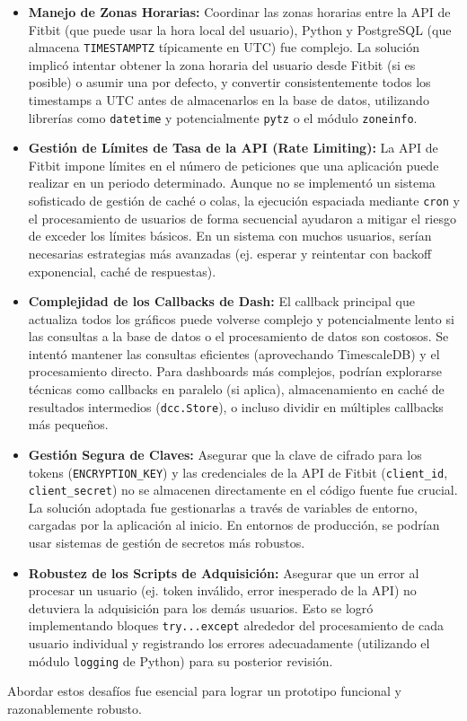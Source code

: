 \begin{itemize}
    \item \textbf{Manejo de Zonas Horarias:} Coordinar las zonas horarias entre la API de Fitbit (que puede usar la hora local del usuario), Python y PostgreSQL (que almacena \texttt{TIMESTAMPTZ} típicamente en UTC) fue complejo. La solución implicó intentar obtener la zona horaria del usuario desde Fitbit (si es posible) o asumir una por defecto, y convertir consistentemente todos los timestamps a UTC antes de almacenarlos en la base de datos, utilizando librerías como \texttt{datetime} y potencialmente \texttt{pytz} o el módulo \texttt{zoneinfo}.
    \item \textbf{Gestión de Límites de Tasa de la API (Rate Limiting):} La API de Fitbit \citep{fitbit_api_reference} impone límites en el número de peticiones que una aplicación puede realizar en un periodo determinado. Aunque no se implementó un sistema sofisticado de gestión de caché o colas, la ejecución espaciada mediante \texttt{cron} y el procesamiento de usuarios de forma secuencial ayudaron a mitigar el riesgo de exceder los límites básicos. En un sistema con muchos usuarios, serían necesarias estrategias más avanzadas (ej. esperar y reintentar con backoff exponencial, caché de respuestas).
    \item \textbf{Complejidad de los Callbacks de Dash:} El callback principal que actualiza todos los gráficos puede volverse complejo y potencialmente lento si las consultas a la base de datos o el procesamiento de datos son costosos. Se intentó mantener las consultas eficientes (aprovechando TimescaleDB) y el procesamiento directo. Para dashboards más complejos, podrían explorarse técnicas como callbacks en paralelo (si aplica), almacenamiento en caché de resultados intermedios (\texttt{dcc.Store}), o incluso dividir en múltiples callbacks más pequeños.
    \item \textbf{Gestión Segura de Claves:} Asegurar que la clave de cifrado para los tokens (\texttt{ENCRYPTION\_KEY}) y las credenciales de la API de Fitbit (\texttt{client\_id}, \texttt{client\_secret}) no se almacenen directamente en el código fuente fue crucial. La solución adoptada fue gestionarlas a través de variables de entorno, cargadas por la aplicación al inicio. En entornos de producción, se podrían usar sistemas de gestión de secretos más robustos.
    \item \textbf{Robustez de los Scripts de Adquisición:} Asegurar que un error al procesar un usuario (ej. token inválido, error inesperado de la API) no detuviera la adquisición para los demás usuarios. Esto se logró implementando bloques \texttt{try...except} alrededor del procesamiento de cada usuario individual y registrando los errores adecuadamente (utilizando el módulo \texttt{logging} de Python) para su posterior revisión.
\end{itemize}
Abordar estos desafíos fue esencial para lograr un prototipo funcional y razonablemente robusto.

